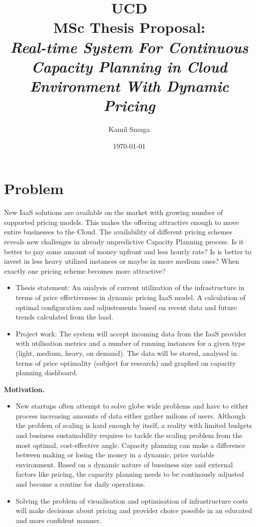 \documentclass[11pt]{artikel3}
\title{UCD
\\MSc Thesis Proposal:\\\emph{Real-time System For Continuous Capacity Planning in Cloud Environment With Dynamic Pricing}}
\author{Kamil Smuga}
\date{\today}
\begin{document}
\maketitle


\section{Problem}

New IaaS solutions are available on the market with growing number of supported pricing models. This makes the offering attractive enough to move entire businesses to the Cloud. The availability of different pricing schemes reveals new challenges in already unpredictive Capacity Planning process. Is it better to pay some amount of money upfront and less hourly rate? Is is better to invest in less heavy utilized instances or maybe in more medium ones? When exactly one pricing scheme becomes more attractive? 

\begin{itemize}
  \item Thesis statement: An analysis of current utilization of the infrastructure in terms of price effectiveness in dynamic pricing IaaS model. A calculation of optimal configuration and adjustements based on recent data and future trends calculated from the load. 
  \item Project work: The system will accept incoming data from the IaaS provider with utilisation metrics and a number of running instances for a given type (light, medium, heavy, on demand). The data will be stored, analysed in terms of price optimality (subject for research) and graphed on capacity planning dashboard.
\end{itemize}


{\bf Motivation.} 
\begin{itemize}
  \item New startups often attempt to solve globe wide problems and have to either process increasing amounts of data either gather milions of users. Although the problem of scaling is hard enough by itself, a reality with limited budgets and business sustainability requires to tackle the scaling problem from the most optimal, cost-effective angle. Capacity planning can make a difference between making or losing the money in a dynamic, price variable environment. Based on a dynamic nature of bussiness size and external factors like pricing, the capacity planning needs to be continously adjusted and become a routine for daily operations. 
  \item Solving the problem of visualisation and optimisation of infrastructure costs will make decisions about pricing and provider choice possible in an educated and more  confident manner. 
\end{itemize}
\end{document}
